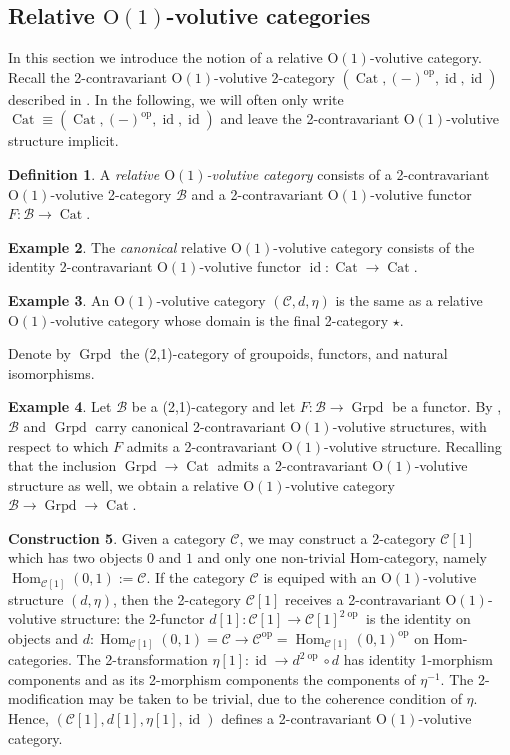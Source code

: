 \documentclass{article}
\newcommand{\opp}{\operatorname{op}}%
\newcommand{\id}{\operatorname{id}}%
\newcommand{\Cat}{\operatorname{Cat}}%
\newcommand{\Hom}{\operatorname{Hom}}%
\newcommand{\Grpd}{\operatorname{Grpd}}%
\newcommand{\Oone}{\operatorname{O(1)}}
\newcommand{\B}{\mathcal{B}}
\newcommand{\C}{\mathcal{C}}
\numberwithin{equation}{section}
\theoremstyle{definition}
\newtheorem{definition}{Definition}[subsection]
\newtheorem{construction}[definition]{Construction}
\newtheorem{example}[definition]{Example}
\theoremstyle{theorem}
\begin{document}
\subsection{Relative $\Oone$-volutive categories}
In this section we introduce the notion of a relative $\Oone$-volutive category. Recall the 2-contravariant $\Oone$-volutive 2-category $(\Cat,(-)^{\opp},\id,\id)$ 
described in . In the following, we will often only write $\Cat \equiv (\Cat,(-)^{\opp},\id,\id)$ and leave 
the 2-contravariant $\Oone$-volutive structure implicit. 
\begin{definition}\label{Definition: relative Oone volutive category}
    A \emph{relative $\Oone$-volutive category} consists of a 2-contravariant $\Oone$-volutive 2-category $\B$ and a 
    2-contravariant $\Oone$-volutive functor $F \colon \B \to \Cat$. 
\end{definition}
\begin{example}
    The \emph{canonical} relative $\Oone$-volutive category consists of the identity 2-contravariant $\Oone$-volutive functor $\id \colon \Cat \to \Cat$.
\end{example}
\begin{example}
    An $\Oone$-volutive category $(\C,d,\eta)$ is the same as a relative $\Oone$-volutive category whose domain is the final 2-category $\star$. 
\end{example}
Denote by $\Grpd$ the (2,1)-category of groupoids, functors, and natural isomorphisms.
\begin{example}
    Let $\B$ be a (2,1)-category and let $F \colon \B \to \Grpd$ be a functor. By , 
    $\B$ and $\Grpd$ carry canonical 2-contravariant $\Oone$-volutive structures, with respect to which $F$ admits a 2-contravariant $\Oone$-volutive structure. 
    Recalling that the inclusion $\Grpd \to \Cat$ admits a 2-contravariant $\Oone$-volutive structure as well, we obtain a relative $\Oone$-volutive category 
    $\B \to \Grpd \to \Cat$. 
\end{example}
\begin{construction}\label{Construction: from Oone volutive categories to 2-categories}
    Given a category $\C$, we may construct a 2-category $\C[1]$ which has two objects $0$ and $1$ and only one non-trivial Hom-category, namely 
    $\Hom_{\C[1]}(0,1) := \C$. If the category $\C$ is equiped with an $\Oone$-volutive structure $(d,\eta)$, then the 2-category $\C[1]$ 
    receives a 2-contravariant $\Oone$-volutive structure: the 2-functor $d[1] \colon \C[1] \to \C[1]^{2\opp}$ is the identity on objects 
    and $d \colon \Hom_{\C[1]}(0,1) = \C \to \C^{\opp} = \Hom_{\C[1]}(0,1)^{\opp}$ on Hom-categories. The 2-transformation $\eta[1] \colon \id \to d^{2\opp} \circ d$
    has identity 1-morphism components and as its 2-morphism components the components of $\eta^{-1}$. The 2-modification may be taken to be trivial, 
    due to the coherence condition of $\eta$. Hence, $(\C[1],d[1],\eta[1],\id)$ defines a 2-contravariant $\Oone$-volutive category. 
\end{construction}
\end{document}
